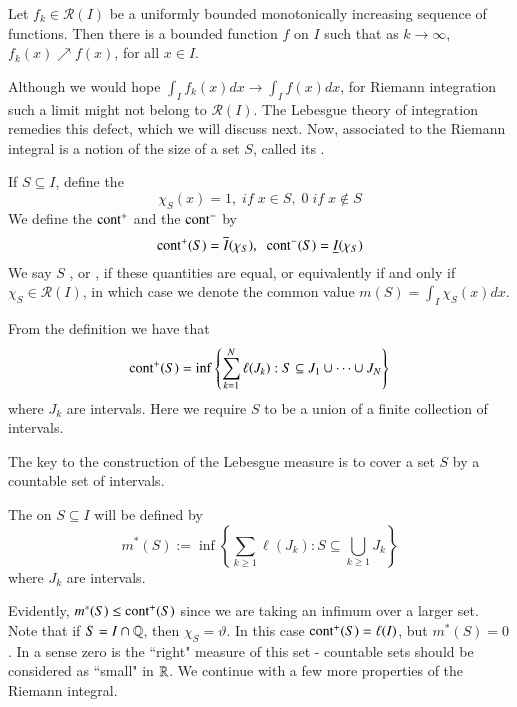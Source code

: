 \begin{prop}
    Let $f_k \in \mathcal{R}(I)$ be a uniformly bounded monotonically increasing sequence of functions. Then there is a bounded function $f$ on $I$ such that as $k\rightarrow \infty$, $f_k(x)\nearrow f(x)$, for all $x \in I$.
\end{prop}

Although we would hope $\int_If_k(x)dx\rightarrow \int_If(x)dx$, for Riemann integration such a limit might not belong to $\mathcal{R}(I)$. The Lebesgue theory of integration remedies this defect, which we will discuss next. Now, associated to the Riemann integral is a notion of the size of a set $S$, called its .

\begin{defn}
    If $S \subseteq I$, define the  $$\chi_S(x) = 1,\;if\;x\in S,\;0\;if\;x\notin S$$ We define the  $\text{cont}^+$ and the  $\text{cont}^-$ by $$\text{cont}^+(S) = \overline{I}(\chi_S),\;\;\text{cont}^-(S) = \underline{I}(\chi_S)$$
    We say $S$ , or , if these quantities are equal, or equivalently if and only if $\chi_S \in \mathcal{R}(I)$, in which case we denote the common value $m(S) = \int_I\chi_S(x)dx$.
\end{defn}

From the definition we have that $$\text{cont}^+(S) = \inf\left\{\sum_{k=1}^N\ell(J_k):S \subseteq J_1\cup \cdots \cup J_N\right\}$$
where $J_k$ are intervals. Here we require $S$ to be a union of a finite collection of intervals.

The key to the construction of the Lebesgue measure is to cover a set $S$ by a countable set of intervals. 

\begin{defn}
    The  on $S \subseteq I$ will be defined by $$m^*(S) := \inf\left\{\sum_{k\geq 1}\ell(J_k):S\subseteq \bigcup_{k\geq 1}J_k\right\}$$ where $J_k$ are intervals.
\end{defn}

Evidently, $m^*(S) \leq \text{cont}^+(S)$ since we are taking an infimum over a larger set. Note that if $S = I\cap \mathbb Q$, then $\chi_S = \vartheta$. In this case $\text{cont}^+(S) = \ell(I)$, but $m^*(S) = 0$. In a sense zero is the ``right" measure of this set - countable sets should be considered as ``small" in $\mathbb R$. We continue with a few more properties of the Riemann integral.

